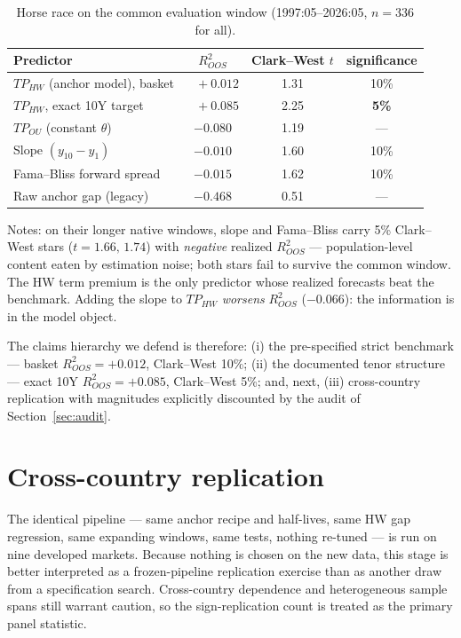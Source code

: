 \documentclass[11pt]{article}
\begin{document}
\begin{table}[t]\centering
\caption{Horse race on the common evaluation window (1997:05--2026:05, $n=336$ for all).}
\label{tab:horse}
\begin{tabular}{lccc}
\toprule
Predictor & $R^2_{OOS}$ & Clark--West $t$ & significance \\
\midrule
$TP_{HW}$ (anchor model), basket & $\;\;\,+0.012$ & 1.31 & 10\% \\
$TP_{HW}$, exact 10Y target & $\;\;\,+0.085$ & 2.25 & \textbf{5\%} \\
$TP_{OU}$ (constant $\theta$) & $-0.080$ & 1.19 & --- \\
Slope $(y_{10}-y_1)$ & $-0.010$ & 1.60 & 10\% \\
Fama--Bliss forward spread & $-0.015$ & 1.62 & 10\% \\
Raw anchor gap (legacy) & $-0.468$ & 0.51 & --- \\
\bottomrule
\end{tabular}
\par\smallskip
\footnotesize Notes: on their longer native windows, slope and Fama--Bliss carry 5\%
Clark--West stars ($t=1.66,\,1.74$) with \emph{negative} realized $R^2_{OOS}$ ---
population-level content eaten by estimation noise; both stars fail to survive the common
window. The HW term premium is the only predictor whose realized forecasts beat the
benchmark. Adding the slope to $TP_{HW}$ \emph{worsens} $R^2_{OOS}$ ($-0.066$): the
information is in the model object.
\end{table}

The claims hierarchy we defend is therefore: (i) the pre-specified strict benchmark ---
basket $R^2_{OOS}=+0.012$, Clark--West 10\%; (ii) the documented tenor structure --- exact
10Y $R^2_{OOS}=+0.085$, Clark--West 5\%; and, next, (iii) cross-country replication with
magnitudes explicitly discounted by the audit of Section~\ref{sec:audit}.

\section{Cross-country replication}\label{sec:panel}

The identical pipeline --- same anchor recipe and half-lives, same HW gap regression, same
expanding windows, same tests, nothing re-tuned --- is run on nine developed markets.
Because nothing is chosen on the new data, this stage is better interpreted as a frozen-pipeline
replication exercise than as another draw from a specification search. Cross-country dependence
and heterogeneous sample spans still warrant caution, so the sign-replication count is treated
as the primary panel statistic.
\end{document}
